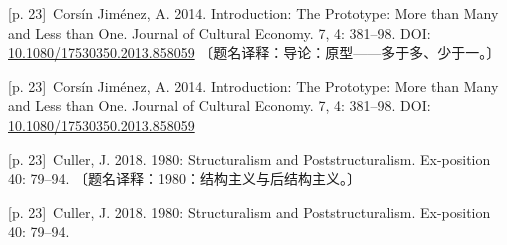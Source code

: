 \documentclass[10pt,a4paper]{article}
\begin{document}
\noindent\begin{minipage}{\textwidth}\begin{minipage}[t]{\dimexpr.5\textwidth-4mm\relax}\noindent\begin{minipage}[t]{\linewidth}{\scriptsize\color{gray} [p. 23]}\ Corsín Jiménez, A. 2014. Introduction: The Prototype: More than Many and Less than One. Journal of Cultural Economy. 7, 4: 381–98. DOI: \url{10.1080/17530350.2013.858059} 〔题名译释：导论：原型——多于多、少于一。〕\par\end{minipage}\par\end{minipage}\hfill\begin{minipage}[t]{\dimexpr.5\textwidth-4mm\relax}\noindent\begin{minipage}[t]{\linewidth}{\scriptsize\color{gray} [p. 23]}\ Corsín Jiménez, A. 2014. Introduction: The Prototype: More than Many and Less than One. Journal of Cultural Economy. 7, 4: 381–98. DOI: \url{10.1080/17530350.2013.858059}\par\end{minipage}\par\end{minipage}\end{minipage}\par
\noindent\begin{minipage}{\textwidth}\begin{minipage}[t]{\dimexpr.5\textwidth-4mm\relax}\noindent\begin{minipage}[t]{\linewidth}{\scriptsize\color{gray} [p. 23]}\ Culler, J. 2018. 1980: Structuralism and Poststructuralism. Ex-position 40: 79–94. 〔题名译释：1980：结构主义与后结构主义。〕\par\end{minipage}\par\end{minipage}\hfill\begin{minipage}[t]{\dimexpr.5\textwidth-4mm\relax}\noindent\begin{minipage}[t]{\linewidth}{\scriptsize\color{gray} [p. 23]}\ Culler, J. 2018. 1980: Structuralism and Poststructuralism. Ex-position 40: 79–94.\par\end{minipage}\par\end{minipage}\end{minipage}\par
\end{document}
